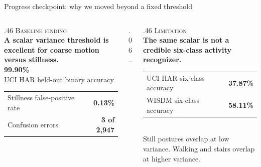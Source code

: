 \documentclass[aspectratio=169,10pt]{beamer}
\begin{document}
\begin{frame}{Progress checkpoint: why we moved beyond a fixed threshold}
  \begin{columns}[T,onlytextwidth]
    \begin{column}{.46\textwidth}
      {\scriptsize\color{teal}\textsc{Baseline finding}}\\[.15cm]
      {\large\bfseries A scalar variance threshold is excellent for coarse motion versus stillness.}\\[.45cm]
      {\color{teal}\fontsize{32}{34}\selectfont\textbf{99.90\%}}\\[-.04cm]
      {\scriptsize\color{muted}UCI HAR held-out binary accuracy}\\[.28cm]
      \begin{tabular}{@{}lr@{}}
        \textcolor{muted}{Stillness false-positive rate} & \textbf{0.13\%} \\
        \textcolor{muted}{Confusion errors} & \textbf{3 of 2,947} \\
      \end{tabular}
    \end{column}
    \begin{column}{.06\textwidth}
      \centering\color{softteal}\rule{1pt}{4.0cm}
    \end{column}
    \begin{column}{.46\textwidth}
      {\scriptsize\color{coral}\textsc{Limitation}}\\[.15cm]
      {\large\bfseries The same scalar is not a credible six-class activity recognizer.}\\[.42cm]
      \begin{tabular}{@{}lr@{}}
        \textcolor{muted}{UCI HAR six-class accuracy} & {\color{coral}\large\textbf{37.87\%}} \\
        \textcolor{muted}{WISDM six-class accuracy} & {\color{coral}\large\textbf{58.11\%}} \\
      \end{tabular}\\[.30cm]
      \small\color{muted}Still postures overlap at low variance. Walking and stairs overlap at higher variance.
    \end{column}
  \end{columns}
\end{frame}

\end{document}
